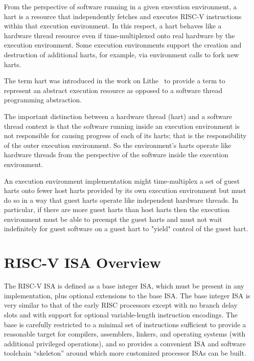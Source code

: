 From the perspective of software running in a given execution
environment, a hart is a resource that independently fetches and
executes RISC-V instructions within that execution environment.  In
this respect, a hart behaves like a hardware thread resource even if
time-multiplexed onto real hardware by the execution environment.
Some execution environments support the creation and destruction of
additional harts, for example, via environment calls to fork new
harts.

\begin{commentary}
The term hart was introduced in the work on
Lithe~\cite{lithe-pan-hotpar09,lithe-pan-pldi10} to provide a term to
represent an abstract execution resource as opposed to a software
thread programming abstraction.

The important distinction between a hardware thread (hart) and a
software thread context is that the software running inside an
execution environment is not responsible for causing progress of each
of its harts; that is the responsibility of the outer execution
environment.  So the environment's harts operate like hardware threads
from the perspective of the software inside the execution environment.

An execution environment implementation might time-multiplex a set of
guest harts onto fewer host harts provided by its own execution
environment but must do so in a way that guest harts operate like
independent hardware threads.  In particular, if there are more guest
harts than host harts then the execution environment must be able to
preempt the guest harts and must not wait indefinitely for guest
software on a guest hart to "yield" control of the guest hart.
\end{commentary}

\section{RISC-V ISA Overview}

The RISC-V ISA is defined as a base integer ISA, which must be present
in any implementation, plus optional extensions to the base ISA.  The
base integer ISA is very similar to that of the early RISC processors
except with no branch delay slots and with support for optional
variable-length instruction encodings.  The base is carefully
restricted to a minimal set of instructions sufficient to provide a
reasonable target for compilers, assemblers, linkers, and operating
systems (with additional privileged operations), and so provides
a convenient ISA and software toolchain ``skeleton'' around which more
customized processor ISAs can be built.

